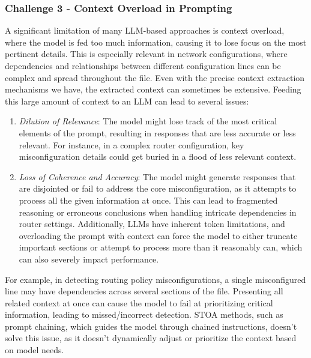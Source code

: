 \subsubsection{Challenge 3 - Context Overload in Prompting}
\label{challenge_3}
A significant limitation of many LLM-based approaches is context overload, where the model is fed too much information, causing it to lose focus on the most pertinent details. This is especially relevant in network configurations, where dependencies and relationships between different configuration lines can be complex and spread throughout the file.
Even with the precise context extraction mechanisms we have, the extracted context can sometimes be extensive. 
Feeding this large amount of context to an LLM can lead to several issues:
\begin{enumerate}
    \item \textit{Dilution of Relevance}: The model might lose track of the most critical elements of the prompt, resulting in responses that are less accurate or less relevant. For instance, in a complex router configuration, key misconfiguration details could get buried in a flood of less relevant context.
    \item \textit{Loss of Coherence and Accuracy}: The model might generate responses that are disjointed or fail to address the core misconfiguration, as it attempts to process all the given information at once. This can lead to fragmented reasoning or erroneous conclusions when handling intricate dependencies in router settings. Additionally, LLMs have inherent token limitations, and overloading the prompt with context can force the model to either truncate important sections or attempt to process more than it reasonably can, which can also severely impact performance.
\end{enumerate}

For example, in detecting routing policy misconfigurations, a single misconfigured line may have dependencies across several sections of the file. Presenting all related context at once can cause the model to fail at prioritizing critical information, leading to missed/incorrect detection. STOA methods, such as prompt chaining, which guides the model through chained instructions, doesn't solve this issue, as it doesn't dynamically adjust or prioritize the context based on model needs.


